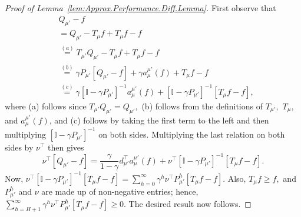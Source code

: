 \documentclass[twoside]{article}
\theoremstyle{plain}
\theoremstyle{definition}
\theoremstyle{remark}
\newcommand{\tr}{\top}
\newcommand{\bI}{\mathbb{I}}
\newcommand{\mup}{\mu'}
\begin{document}
\begin{proof}[Proof of Lemma~\ref{lem:Approx.Performance.Diff.Lemma}]
    First observe that 
    \begin{align*}
        & Q_{\mup} - f \\
        & = Q_{\mup} - T_{\mu}f + T_{\mu} f - f\\
        &\overset{(a)}{=} {} T_{\mup} Q_{\mup} - T_{\mu}f  + T_{\mu}f - f \\
        & \overset{(b)}{=}  {} \gamma P_{\mup} [Q_{\mup} - f] + \gamma a_{\mu}^{\mup}(f)  + T_{\mu}f - f \\
        &\overset{(c)}{=} {} \gamma [\bI - \gamma P_{\mup}]^{-1}  a_{\mu}^{\mup}(f)  + [\bI - \gamma P_{\mup}]^{-1} [T_{\mu}f - f], 
    \end{align*}
    where (a) follows since $T_{\mup} Q_{\mup} = Q_{\mup},$ (b) follows from the definitions of $T_{\mup},$  $T_{\mu},$ and $a_\mu^{\mup}(f)$, and (c) follows by taking the first term to the left and then multiplying $[\bI - \gamma P_{\mup}]^{-1}$ on both sides. Multiplying the last relation on both sides by $\nu^\tr$ then gives
    \begin{equation}    \label{e:Q_mup.f.exact.relation}
        \nu^\tr [Q_{\mup} - f] = \frac{\gamma}{1 - \gamma} d_{\mup}^\tr  a_{\mu}^{\mup}(f) + \nu^\tr [\bI - \gamma P_{\mup}]^{-1} [T_{\mu}f - f].
    \end{equation}
    Now, $\nu^\tr[\bI - \gamma P_{\mup}]^{-1} [T_\mu f - f] = \sum_{h = 0}^\infty \gamma^h \nu^\tr P_{\mup}^h [T_\mu f - f].$
    Also, $T_{\mu}f \geq f,$ and $P_{\mup}^h$ and $\nu$ are made up of non-negative entries; hence,  $\sum_{h = H + 1}^\infty 
        \gamma^h \nu^\tr P_{\mup}^h [T_\mu f - f] \geq 0.$ 
    The desired result now follows. 
\end{proof}



%
\end{document}
